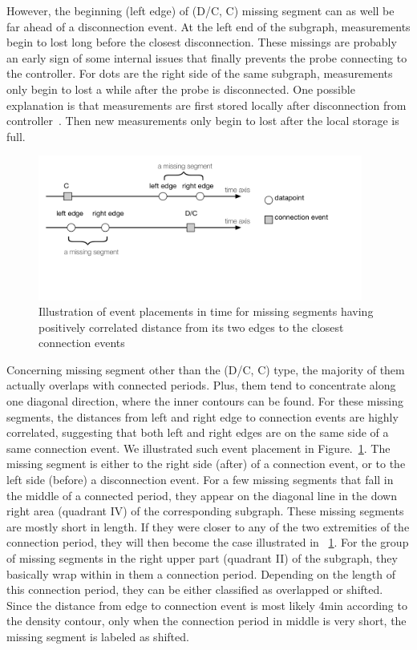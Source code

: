 However, the beginning (left edge) of (D/C, C) missing segment can as well be far ahead of a disconnection event.
At the left end of the subgraph, measurements begin to lost long before the closest disconnection.
These missings are probably an early sign of some internal issues that finally prevents the probe connecting to the controller. 
For dots are the right side of the same subgraph, measurements only begin to lost a while after the probe is disconnected. One possible explanation is that measurements are first stored locally after disconnection from controller~\cite{usb}. Then new measurements only begin to lost after the local storage is full.

\begin{figure}[!htb]
\centering
\includegraphics[width=0.95\textwidth]{gfx/chap3/pos_diag_miss_seg.pdf}
\caption{Illustration of event placements in time for missing segments having positively correlated distance from its two edges to the closest connection events}
\label{fig:pos_diag_miss_seg}
\end{figure}

Concerning missing segment other than the (D/C, C) type,  the majority of them actually overlaps with connected periods.
Plus, them tend to concentrate along one diagonal direction, where the inner contours can be found.
For these missing segments, the distances from left and right edge to connection events are highly correlated, suggesting that both left and right edges are on the same side of a same connection event.
We illustrated such event placement in Figure.~\ref{fig:pos_diag_miss_seg}.
The missing segment is either to the right side (after) of a connection event, or to the left side (before) a disconnection event.
For a few missing segments that fall in the middle of a connected period, they appear on the diagonal line in the down right area (quadrant IV) of the corresponding subgraph.
These missing segments are mostly short in length.
If they were closer to any of the two extremities of the connection period, they will then become the case illustrated in ~\ref{fig:pos_diag_miss_seg}.
For the group of missing segments in the right upper part (quadrant II) of the subgraph, they basically wrap within in them a connection period.
Depending on the length of this connection period, they can be either classified as overlapped or shifted.
Since the distance from edge to connection event is most likely 4min according to the density contour, only when the connection period in middle is very short, the missing segment is labeled as shifted.

